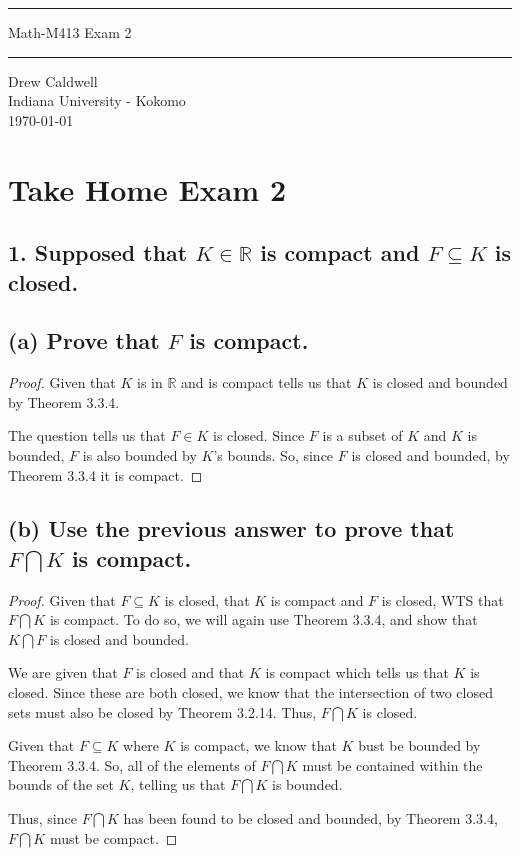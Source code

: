 \documentclass{article}
\begin{document}
\begin{titlepage}
\scshape
\centering
\raisebox{-\baselineskip}{\rule{\textwidth}{1px}}
\vspace{.3cm}
\rule{\textwidth}{.5px}
\vspace{.3cm}
{\huge{{Math-M413 Exam 2}}}\par \vspace{0.3cm}
\rule{\textwidth}{2px}

\large{Drew Caldwell}\\
\large{Indiana University - Kokomo}\\
\vspace{1.3cm}
\vfill
\today
\end{titlepage}

\section*{Take Home Exam 2}

\subsection*{1. Supposed that $K \in \mathbb{R}$ is compact and $F \subseteq K$ is closed.}

\subsection*{(a) Prove that $F$ is compact.}
\begin{proof}
Given that $K$ is in $\mathbb{R}$ and is compact tells us that $K$ is closed and bounded by Theorem 3.3.4. 

The question tells us that $F \in K$ is closed. Since $F$ is a subset of $K$ and $K$ is bounded, $F$ is also bounded 
by $K$'s bounds. So, since $F$ is closed and bounded, by Theorem 3.3.4 it is compact.
\end{proof}

\subsection*{(b) Use the previous answer to prove that $F \bigcap K$ is compact.}
\begin{proof}
Given that $F \subseteq K$ is closed, that $K$ is compact and $F$ is closed, WTS that $F \bigcap K$ is compact. To do so, 
we will again use Theorem 3.3.4, and show that $K \bigcap F$ is closed and bounded.

We are given that $F$ is closed and that $K$ is compact which tells us that $K$ is closed. Since these are both closed, we 
know that the intersection of two closed sets must also be closed by Theorem 3.2.14. Thus, $F \bigcap K$ is closed.

Given that $F \subseteq K$ where $K$ is compact, we know that $K$ bust be bounded by Theorem 3.3.4. So, all of the elements 
of $F \bigcap K$ must be contained within the bounds of the set $K$, telling us that $F \bigcap K$ is bounded.

Thus, since $F \bigcap K$ has been found to be closed and bounded, by Theorem 3.3.4, $F \bigcap K$ must be compact.
\end{proof}
\end{document}
